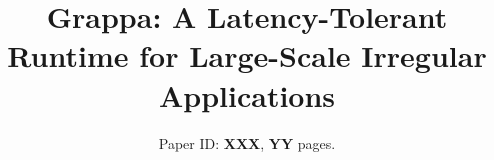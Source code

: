 
\usepackage{microtype}




\title{\Large Grappa: A Latency-Tolerant Runtime for Large-Scale Irregular Applications}


\author{Paper ID: {\bf XXX}, {\bf YY} pages.}
\date{}


\maketitle
\begin{abstract}

\end{abstract}




















%






